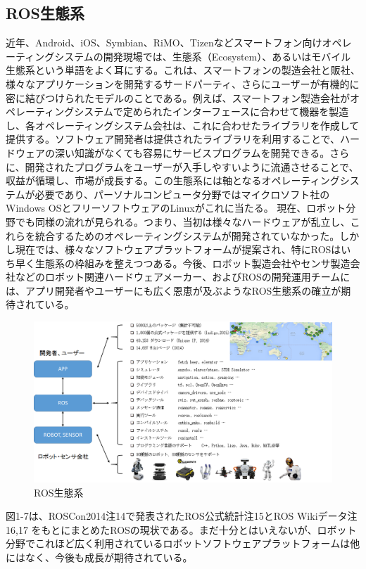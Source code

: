 \subsection{ROS生態系}

近年、Android、iOS、Symbian、RiMO、Tizenなどスマートフォン向けオペレーティングシステムの開発現場では、生態系（Ecosystem）、あるいはモバイル生態系という単語をよく耳にする。これは、スマートフォンの製造会社と販社、様々なアプリケーションを開発するサードパーティ、さらにユーザーが有機的に密に結びつけられたモデルのことである。例えば、スマートフォン製造会社がオペレーティングシステムで定められたインターフェースに合わせて機器を製造し、各オペレーティングシステム会社は、これに合わせたライブラリを作成して提供する。ソフトウェア開発者は提供されたライブラリを利用することで、ハードウェアの深い知識がなくても容易にサービスプログラムを開発できる。さらに、開発されたプログラムをユーザーが入手しやすいように流通させることで、収益が循環し、市場が成長する。この生態系には軸となるオペレーティングシステムが必要であり、パーソナルコンピュータ分野ではマイクロソフト社のWindows OSとフリーソフトウェアのLinuxがこれに当たる。
現在、ロボット分野でも同様の流れが見られる。つまり、当初は様々なハードウェアが乱立し、これらを統合するためのオペレーティングシステムが開発されていなかった。しかし現在では、様々なソフトウェアプラットフォームが提案され、特にROSはいち早く生態系の枠組みを整えつつある。今後、ロボット製造会社やセンサ製造会社などのロボット関連ハードウェアメーカー、およびROSの開発運用チームには、アプリ開発者やユーザーにも広く恩恵が及ぶようなROS生態系の確立が期待されている。

\begin{figure}[h]
  \centering
  \includegraphics[width=\columnwidth]{pictures/chapter1/pic_01_03.png}
  \caption{ROS生態系}
\end{figure}

図1-7は、ROSCon2014注14で発表されたROS公式統計注15とROS Wikiデータ注16,17 をもとにまとめたROSの現状である。まだ十分とはいえないが、ロボット分野でこれほど広く利用されているロボットソフトウェアプラットフォームは他にはなく、今後も成長が期待されている。

